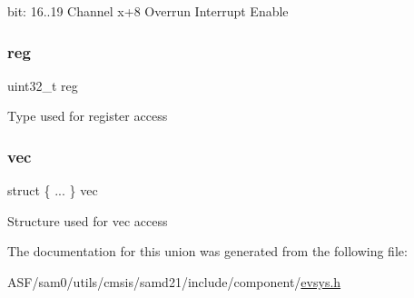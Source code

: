 bit\+: 16..19 Channel x+8 Overrun Interrupt Enable \mbox{\label{union_e_v_s_y_s___i_n_t_e_n_s_e_t___type_a6b91636401516a477989a336376d7b40}} 
\subsubsection{\texorpdfstring{reg}{reg}}
{\footnotesize\ttfamily uint32\+\_\+t reg}

Type used for register access \mbox{\label{union_e_v_s_y_s___i_n_t_e_n_s_e_t___type_a7991f7631764e55eb7df37c35a9f604b}} 
\subsubsection{\texorpdfstring{vec}{vec}}
{\footnotesize\ttfamily struct \{ ... \}   vec}

Structure used for vec access 

The documentation for this union was generated from the following file\+:\begin{DoxyCompactItemize}
\item 
A\+S\+F/sam0/utils/cmsis/samd21/include/component/\mbox{\hyperlink{component_2evsys_8h}{evsys.\+h}}\end{DoxyCompactItemize}
